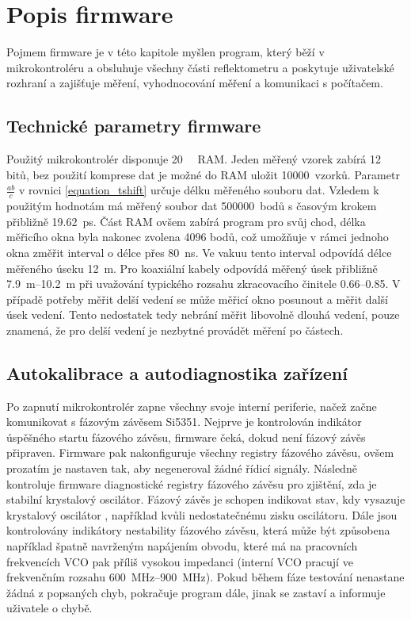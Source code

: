 \chapter{Popis firmware}

Pojmem firmware je v této kapitole myšlen program, který běží v mikrokontroléru a obsluhuje všechny části reflektometru a poskytuje uživatelské rozhraní a zajišťuje měření, vyhodnocování měření a komunikaci s počítačem.

\section{Technické parametry firmware}
Použitý mikrokontrolér disponuje \SI{20}{\kilo\byte} \acrshort{RAM}. Jeden měřený vzorek zabírá 12 bitů, bez použití komprese dat je možné do \acrshort{RAM} uložit 10000~vzorků. Parametr $\frac{a b}{c}$ v rovnici \ref{equation_tshift} určuje délku měřeného souboru dat. Vzledem k použitým hodnotám má měřený soubor dat 500000~bodů s časovým krokem přibližně \SI{19.62}{\pico\second}. Část RAM ovšem zabírá program pro svůj chod, délka měřicího okna byla nakonec zvolena 4096 bodů, což umožňuje v rámci jednoho okna změřit interval o délce přes \SI{80}{\nano\second}. Ve vakuu tento interval odpovídá délce měřeného úseku \SI{12}{\meter}. Pro koaxiální kabely odpovídá měřený úsek přibližně \SIrange{7.9}{10.2}{\meter} při uvažování typického rozsahu zkracovacího činitele \SIrange{0.66}{0.85}{}. V případě potřeby měřit delší vedení se může měřicí okno posunout a měřit další úsek vedení. Tento nedostatek tedy nebrání měřit libovolně dlouhá vedení, pouze znamená, že pro delší vedení je nezbytné provádět měření po částech.

\section{Autokalibrace a autodiagnostika zařízení}
Po zapnutí mikrokontrolér zapne všechny svoje interní periferie, načež začne komunikovat s fázovým závěsem Si5351. Nejprve je kontrolován indikátor úspěšného startu fázového závěsu, firmware čeká, dokud není fázový závěs připraven. Firmware pak nakonfiguruje všechny registry fázového závěsu, ovšem prozatím je nastaven tak, aby negeneroval žádné řídicí signály. Následně kontroluje firmware diagnostické registry fázového závěsu pro zjištění, zda je stabilní krystalový oscilátor. Fázový závěs je schopen indikovat stav, kdy vysazuje krystalový oscilátor \cite{Si5351datasheet}, například kvůli nedostatečnému zisku oscilátoru. Dále jsou kontrolovány indikátory nestability fázového závěsu, která může být způsobena například špatně navrženým napájením obvodu, které má na pracovních frekvencích \acrshort{VCO} pak příliš vysokou impedanci (interní \acrshort{VCO} pracují ve frekvenčním rozsahu \SIrange{600}{900}{\mega\hertz}). Pokud během fáze testování nenastane žádná z popsaných chyb, pokračuje program dále, jinak se zastaví a informuje uživatele o chybě.

